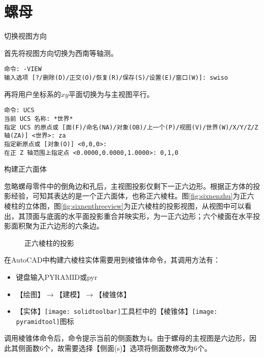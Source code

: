 \section{螺母}
\begin{procedure}
\item 切换视图方向

首先将视图方向切换为西南等轴测。

\begin{lstlisting}
命令: -VIEW
输入选项 [?/删除(D)/正交(O)/恢复(R)/保存(S)/设置(E)/窗口(W)]: swiso
\end{lstlisting}

再将用户坐标系的$xy$平面切换为与主视图平行。

\begin{lstlisting}
命令: UCS
当前 UCS 名称: *世界*
指定 UCS 的原点或 [面(F)/命名(NA)/对象(OB)/上一个(P)/视图(V)/世界(W)/X/Y/Z/Z 轴(ZA)] <世界>: za
指定新原点或 [对象(O)] <0,0,0>:
在正 Z 轴范围上指定点 <0.0000,0.0000,1.0000>: 0,1,0
\end{lstlisting}

\item 构建正六面体

忽略螺母零件中的倒角边和孔后，主视图投影仅剩下一正六边形。根据正方体的投影经验，可知其表达的是一个正六面体，也称正六棱柱。图\ref{fig:sixnenzhu}为正六棱柱的立体图，图\ref{fig:sixnenthreeview}为正六棱柱的投影视图，从视图中可以看出，其顶面与底面的水平面投影重合并映实形，为一正六边形；六个棱面在水平投影面积聚为正六边形的六条边。

\begin{figure}[htbp]
\centering
{}\hspace{30pt}
\caption{正六棱柱的投影}
\end{figure}

在AutoCAD中构建六棱柱实体需要用到棱锥体命令，其调用方法有：
\begin{itemize}
\item 键盘输入PYRAMID或pyr
\item 【绘图】$\rightarrow $【建模】$\rightarrow $【棱锥体】
\item 【实体】\texttt{[image: solidtoolbar]}工具栏中的【棱锥体】\texttt{[image: pyramidtool]}图标
\end{itemize}

调用棱锥体命令后，命令提示当前的侧面数为4。由于螺母的主视图是六边形，因此其侧面数6个，故需要选择【侧面(s)】选项将侧面数修改为6个。


\end{procedure}
